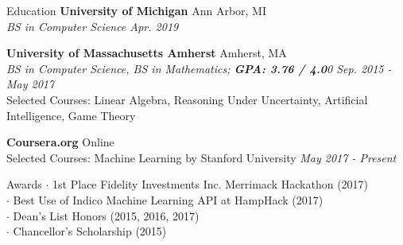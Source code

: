 \documentclass{resume} %
\begin{document}
	
	

	\begin{rSection}{Education}
		{\bf University of Michigan} \hfill {Ann Arbor, MI} \\ 
		\textit{BS in Computer Science \hfill {Apr. 2019}}
		
		{\bf University of Massachusetts Amherst} \hfill {Amherst, MA} \\ 
		\textit{BS in Computer Science, BS in Mathematics; \textbf{GPA: 3.76 / 4.0}0 \hfill {Sep. 2015 - May 2017} }\\
		Selected Courses: Linear Algebra, Reasoning Under Uncertainty, Artificial Intelligence, Game Theory
		
		\textbf{Coursera.org} \hfill {Online} \\ 
		Selected Courses: Machine Learning by Stanford University \hfill {\textit{May 2017 - Present}}
	\end{rSection}
	
	
	\begin{rSection}{Awards}
		$\cdot$ 1st Place Fidelity Investments Inc. Merrimack Hackathon (2017) \\
		$\cdot$ Best Use of Indico Machine Learning API at HampHack (2017) \\
		$\cdot$ Dean's List Honors (2015, 2016, 2017) \\
		$\cdot$ Chancellor's Scholarship (2015)
	\end{rSection}

	
\end{document}
